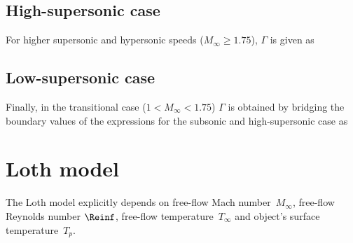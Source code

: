     \subsection{High-supersonic case} \label{DH-h}
        For higher supersonic and hypersonic speeds ($M_\infty \geq \num{1.75}$), $\Gamma$ is given as

    \subsection{Low-supersonic case} \label{DH-l}
        Finally, in the transitional case ($1 < M_\infty < \num{1.75}$) $\Gamma$ is obtained
        by bridging the boundary values of the expressions for the subsonic and high-supersonic case as


\section{Loth model} \label{DL}
    The Loth model \citep{loth2008} explicitly depends on free-flow Mach number~$M_\infty$,
    free-flow Reynolds number $\Reinf$, free-flow temperature~$T_\infty$
    and object's surface temperature~$T_p$.





